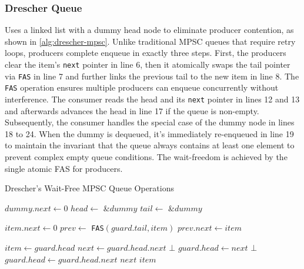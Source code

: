 \subsubsection{Drescher Queue}\label{subsubsec:drescher-mpsc-queue}
Uses a linked list with a dummy head node to eliminate producer contention, as shown in \cref{alg:drescher-mpsc}. Unlike traditional \ac{MPSC} queues that require retry loops, producers complete enqueue in exactly three steps. First, the producers clear the item's \texttt{next} pointer in line 6, then it atomically swaps the tail pointer via \texttt{\ac{FAS}} in line 7 and further links the previous tail to the new item in line 8. The \texttt{\ac{FAS}} operation ensures multiple producers can enqueue concurrently without interference. The consumer reads the head and its \texttt{next} pointer in lines 12 and 13 and afterwards advances the head in line 17 if the queue is non-empty. Subsequently, the consumer handles the special case of the dummy node in lines 18 to 24. When the dummy is dequeued, it's immediately re-enqueued in line 19 to maintain the invariant that the queue always contains at least one element to prevent complex empty queue conditions. The wait-freedom is achieved by the single atomic \ac{FAS} for producers. \cite{Drescher2015GuardedSections}

\begin{algorithm}[!ht]
    \centering
    \captionsetup{justification=centering}
    \caption{Drescher's Wait-Free \ac{MPSC} Queue Operations}
    \label{alg:drescher-mpsc}
    \scriptsize
    \begin{algorithmic}[1]
        \State $dummy.next \gets 0$
        \State $head \gets$ \&$dummy$
        \State $tail \gets$ \&$dummy$
        
        \State
        
            \State $item.next \gets 0$ 
            \State $prev \gets$ \texttt{FAS}$(guard.tail, item)$ 
            \State $prev.next \gets item$ 
        \EndProcedure
        
        \State
        
            \State $item \gets guard.head$
            \State $next \gets guard.head.next$
             
                \State \Return $\bot$
            \EndIf
            \State $guard.head \gets next$
             
                \State {} 
                 
                    \State \Return $\bot$
                \EndIf
                \State $guard.head \gets guard.head.next$
                \State \Return $next$
            \EndIf
            \State \Return $item$
        \EndFunction
    \end{algorithmic}
\end{algorithm}

